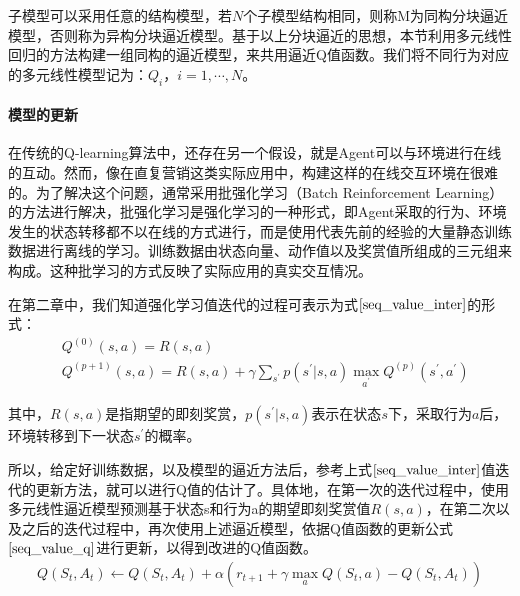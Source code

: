 子模型可以采用任意的结构模型，若$N$个子模型结构相同，则称M为同构分块逼近模型，否则称为异构分块逼近模型。基于以上分块逼近的思想，本节利用多元线性回归的方法构建一组同构的逼近模型，来共用逼近Q值函数。我们将不同行为对应的多元线性模型记为：$Q_{i}$，$i=1,\cdots,N$。


\paragraph{模型的更新}
在传统的Q-learning算法中，还存在另一个假设，就是Agent可以与环境进行在线的互动。然而，像在直复营销这类实际应用中，构建这样的在线交互环境在很难的。为了解决这个问题，通常采用批强化学习（Batch Reinforcement Learning）的方法进行解决\citep{lange2012batch}，批强化学习是强化学习的一种形式，即Agent采取的行为、环境发生的状态转移都不以在线的方式进行，而是使用代表先前的经验的大量静态训练数据进行离线的学习。训练数据由状态向量、动作值以及奖赏值所组成的三元组来构成。这种批学习的方式反映了实际应用的真实交互情况。

在第二章中，我们知道强化学习值迭代的过程可表示为式$\eqref{seq_value_inter}$的形式：
\begin{equation}\label{seq_value_inter}
\begin{aligned}
&Q^{(0)}(s,a) = R(s,a) \\
&Q^{(p+1)}(s,a) = R(s,a) + \gamma \sum_{s^{'}} p(s^{'}|s,a) \max_{a^{'}} Q^{(p)}(s^{'},a^{'})
\end{aligned}
\end{equation}

其中，$R(s,a)$是指期望的即刻奖赏，$p(s^{'}|s,a)$表示在状态$s$下，采取行为$a$后，环境转移到下一状态$s^{'}$的概率。

所以，给定好训练数据，以及模型的逼近方法后，参考上式$\eqref{seq_value_inter}$值迭代的更新方法，就可以进行Q值的估计了。具体地，在第一次的迭代过程中，使用多元线性逼近模型预测基于状态s和行为a的期望即刻奖赏值$R(s,a)$，在第二次以及之后的迭代过程中，再次使用上述逼近模型，依据Q值函数的更新公式$\eqref{seq_value_q}$进行更新，以得到改进的Q值函数。
\begin{equation}\label{seq_value_q}
\begin{aligned}
Q(S_{t}, A_{t}) \gets Q(S_{t}, A_{t}) + \alpha (r_{t+1} + \gamma \max_{a} Q(S_{t}, a) - Q(S_{t}, A_{t}))
\end{aligned}
\end{equation}

